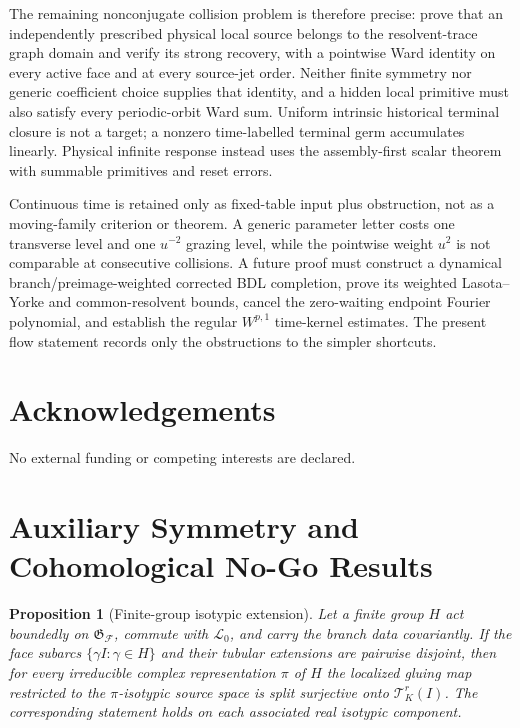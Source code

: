 \documentclass[11pt]{amsart}
\theoremstyle{compactplain}
\newtheorem*{proposition*}{Proposition}
\theoremstyle{compactdefinition}
\theoremstyle{compactremark}
\newcommand{\Ltransfer}{\mathscr L}
\begin{document}
The remaining nonconjugate collision problem is therefore precise: prove that
an independently prescribed physical local source belongs to the
resolvent-trace graph domain and verify its strong recovery, with a pointwise
Ward identity
on every active face and at every source-jet order.  Neither finite symmetry
nor generic coefficient choice supplies that identity, and a hidden local
primitive must also satisfy every periodic-orbit Ward sum.  Uniform
intrinsic historical terminal closure is not a target;
a nonzero time-labelled terminal germ accumulates linearly.  Physical infinite
response instead uses the assembly-first scalar theorem with summable
primitives and reset errors.

Continuous time is retained only as fixed-table input plus obstruction, not as
a moving-family criterion or theorem.  A generic
parameter letter costs one transverse level and one \(u^{-2}\) grazing level,
while the pointwise weight \(u^2\) is not comparable at consecutive
collisions.  A future proof must construct a dynamical branch/preimage-weighted
corrected BDL completion, prove its weighted Lasota--Yorke and common-resolvent
bounds, cancel the zero-waiting endpoint Fourier polynomial, and establish the
regular \(W^{p,1}\) time-kernel estimates.  The present flow statement records
only the obstructions to the simpler shortcuts.

\section*{Acknowledgements}
No external funding or competing interests are declared.

\appendix

\section{Auxiliary Symmetry and Cohomological No-Go Results}

\begin{proposition*}[Finite-group isotypic extension]
Let a finite group \(H\) act boundedly on
\(\mathfrak G_{\mathscr F}\), commute with
\(\Ltransfer_0\), and carry the branch data covariantly.  If the face subarcs
\(\{\gamma I:\gamma\in H\}\) and their tubular extensions are pairwise
disjoint, then for every irreducible complex representation \(\pi\) of \(H\)
the localized gluing map restricted to the \(\pi\)-isotypic source space is
split surjective onto \(\mathcal T_K^r(I)\).  The corresponding statement
holds on each associated real isotypic component.
\end{proposition*}
\end{document}
